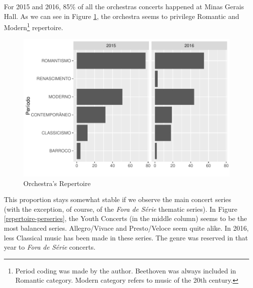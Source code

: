 \documentclass[a4paper, 12pt, openright, oneside, german, french, brazil, english]{abntex2}
\begin{document}

        For 2015 and 2016, 85\% of all the orchestras concerts happened at Minas Gerais Hall. As we can see in Figure \ref{repertoire-peryear}, the orchestra seems to privilege Romantic and Modern\footnote{Period coding was made by the author. Beethoven was always included in Romantic category. Modern category refers to music of the 20th century.} repertoire.

        \begin{figure}[!h]
          \centering
          \caption{Orchestra's Repertoire}
          \label{repertoire-peryear}
          \includegraphics[scale=1]{periodo_peryear.pdf}
        \end{figure}


        This proportion stays somewhat stable if we observe the main concert series (with the exception, of course, of the \textit{Fora de Série} thematic series). In Figure \ref{repertoire-perseries}, the Youth Concerts (in the middle column) seems to be the most balanced series. Allegro/Vivace and Presto/Veloce seem quite alike. In 2016, less Classical music has been made in these series. The genre was reserved in that year to \textit{Fora de Série} concerts. 
\end{document}
